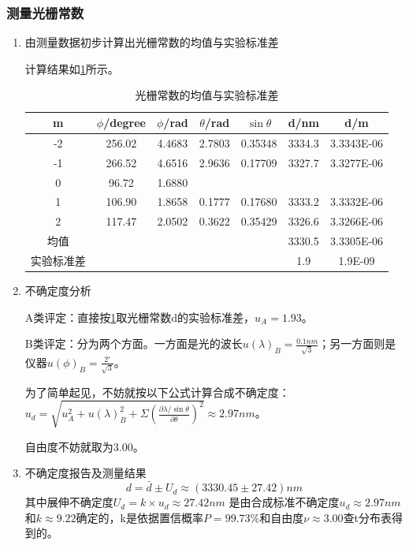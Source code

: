 \documentclass[dvipsnames, svgnames,a4paper,11pt]{article}
\begin{document}
	\subsubsection{测量光栅常数}
	\begin{enumerate}
		\item 由测量数据初步计算出光栅常数的均值与实验标准差
		
		计算结果如\cref{tab:tab3}所示。
		\begin{table}[htbp]
			\centering
			\caption{光栅常数的均值与实验标准差}
			\begin{tabular}{|c|c|c|c|c|c|c|}
				\hline
				m & $\phi$/degree & $\phi$/rad & $\theta$/rad & $\sin{\theta}$ & d/nm & d/m \\
				\hline
				-2 & 256.02 & 4.4683 & 2.7803 & 0.35348 & 3334.3 & 3.3343E-06 \\
				-1 & 266.52 & 4.6516 & 2.9636 & 0.17709 & 3327.7 & 3.3277E-06 \\
				0 & 96.72 & 1.6880 & & & & \\
				1 & 106.90 & 1.8658 & 0.1777 & 0.17680 & 3333.2 & 3.3332E-06 \\
				2 & 117.47 & 2.0502 & 0.3622 & 0.35429 & 3326.6 & 3.3266E-06 \\
				\hline
				均值 & & & & & 3330.5 & 3.3305E-06 \\
				实验标准差 & & & & & 1.9 & 1.9E-09 \\
				\hline
			\end{tabular}
			\label{tab:tab3}
		\end{table}
		
		\item 不确定度分析
		
		A类评定：直接按\cref{tab:tab3}取光栅常数d的实验标准差，$u_A=1.93$。
		
		B类评定：分为两个方面。一方面是光的波长$u(\lambda)_{B}=\frac{0.1nm}{\sqrt{3}}$；另一方面则是仪器$u(\phi)_{B}=\frac{2'}{\sqrt{3}}$。
		
		为了简单起见，不妨就按以下公式计算合成不确定度：$u_d=\sqrt{u_A^2+u(\lambda)_{B}^2+\Sigma (\frac{\partial \lambda/\sin\theta}{\partial \theta})^2}\approx 2.97nm$。
		
		自由度不妨就取为3.00。
		
		\item 不确定度报告及测量结果
		\begin{equation*}
			d=\bar{d}\pm U_{d}\approx( 3330.45 \pm  27.42 )nm
		\end{equation*} 
		其中展伸不确定度$U_{d}={k}\times{u_{d}}\approx 27.42nm $ 是由合成标准不确定度$u_{d}\approx 2.97nm $ 和$k\approx9.22$确定的，k是依据置信概率$P=99.73\%$和自由度$\nu\approx3.00$查t分布表得到的。
	\end{enumerate}
	
\end{document}
